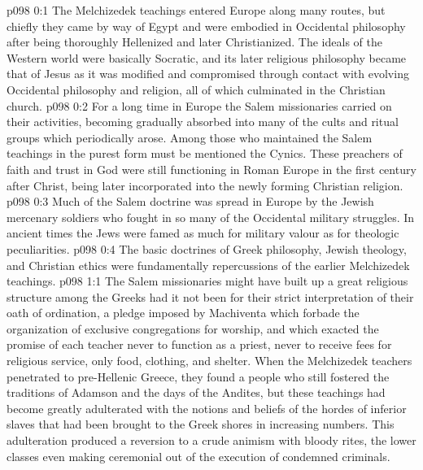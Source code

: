 \author{Melchizedek}
\vs p098 0:1 The Melchizedek teachings entered Europe along many routes, but chiefly they came by way of Egypt and were embodied in Occidental philosophy after being thoroughly Hellenized and later Christianized. The ideals of the Western world were basically Socratic, and its later religious philosophy became that of Jesus as it was modified and compromised through contact with evolving Occidental philosophy and religion, all of which culminated in the Christian church.
\vs p098 0:2 For a long time in Europe the Salem missionaries carried on their activities, becoming gradually absorbed into many of the cults and ritual groups which periodically arose. Among those who maintained the Salem teachings in the purest form must be mentioned the Cynics. These preachers of faith and trust in God were still functioning in Roman Europe in the first century after Christ, being later incorporated into the newly forming Christian religion.
\vs p098 0:3 Much of the Salem doctrine was spread in Europe by the Jewish mercenary soldiers who fought in so many of the Occidental military struggles. In ancient times the Jews were famed as much for military valour as for theologic peculiarities.
\vs p098 0:4 The basic doctrines of Greek philosophy, Jewish theology, and Christian ethics were fundamentally repercussions of the earlier Melchizedek teachings.
\vs p098 1:1 The Salem missionaries might have built up a great religious structure among the Greeks had it not been for their strict interpretation of their oath of ordination, a pledge imposed by Machiventa which forbade the organization of exclusive congregations for worship, and which exacted the promise of each teacher never to function as a priest, never to receive fees for religious service, only food, clothing, and shelter. When the Melchizedek teachers penetrated to pre\hyp{}Hellenic Greece, they found a people who still fostered the traditions of Adamson and the days of the Andites, but these teachings had become greatly adulterated with the notions and beliefs of the hordes of inferior slaves that had been brought to the Greek shores in increasing numbers. This adulteration produced a reversion to a crude animism with bloody rites, the lower classes even making ceremonial out of the execution of condemned criminals.
